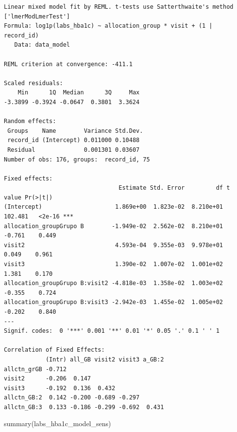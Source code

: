 \documentclass[
  12pt,
]{article}
\newenvironment{Shaded}{\begin{snugshade}}{\end{snugshade}}
\newcommand{\FunctionTok}[1]{\textcolor[rgb]{0.28,0.35,0.67}{#1}}
\newcommand{\NormalTok}[1]{\textcolor[rgb]{0.00,0.23,0.31}{#1}}
\begin{document}
\begin{verbatim}
Linear mixed model fit by REML. t-tests use Satterthwaite's method ['lmerModLmerTest']
Formula: log1p(labs_hba1c) ~ allocation_group * visit + (1 | record_id)
   Data: data_model

REML criterion at convergence: -411.1

Scaled residuals: 
    Min      1Q  Median      3Q     Max 
-3.3899 -0.3924 -0.0647  0.3801  3.3624 

Random effects:
 Groups    Name        Variance Std.Dev.
 record_id (Intercept) 0.011000 0.10488 
 Residual              0.001301 0.03607 
Number of obs: 176, groups:  record_id, 75

Fixed effects:
                                 Estimate Std. Error         df t value Pr(>|t|)    
(Intercept)                     1.869e+00  1.823e-02  8.210e+01 102.481   <2e-16 ***
allocation_groupGrupo B        -1.949e-02  2.562e-02  8.210e+01  -0.761    0.449    
visit2                          4.593e-04  9.355e-03  9.978e+01   0.049    0.961    
visit3                          1.390e-02  1.007e-02  1.001e+02   1.381    0.170    
allocation_groupGrupo B:visit2 -4.818e-03  1.358e-02  1.003e+02  -0.355    0.724    
allocation_groupGrupo B:visit3 -2.942e-03  1.455e-02  1.005e+02  -0.202    0.840    
---
Signif. codes:  0 '***' 0.001 '**' 0.01 '*' 0.05 '.' 0.1 ' ' 1

Correlation of Fixed Effects:
            (Intr) all_GB visit2 visit3 a_GB:2
allctn_grGB -0.712                            
visit2      -0.206  0.147                     
visit3      -0.192  0.136  0.432              
allctn_GB:2  0.142 -0.200 -0.689 -0.297       
allctn_GB:3  0.133 -0.186 -0.299 -0.692  0.431
\end{verbatim}

\begin{Shaded}
\begin{Highlighting}[]
\FunctionTok{summary}\NormalTok{(labs\_hba1c\_model\_sens)}
\end{Highlighting}
\end{Shaded}
\end{document}
